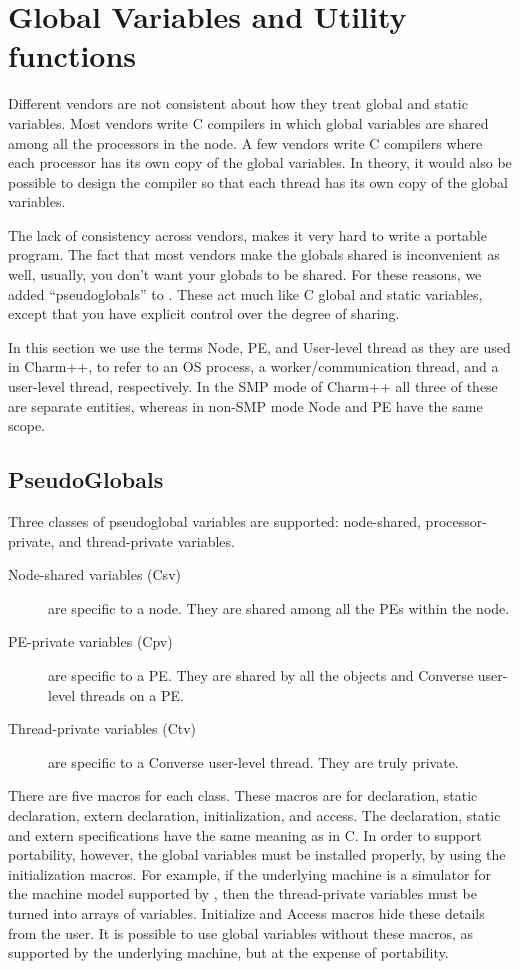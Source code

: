 \section{Global Variables and Utility functions}
\label{globalvars}

Different vendors are not consistent about how they treat global and static
variables.  Most vendors write C compilers in which global variables are
shared among all the processors in the node.  A few vendors write C
compilers where each processor has its own copy of the global variables.
In theory, it would also be possible to design the compiler so that
each thread has its own copy of the global variables.

The lack of consistency across vendors, makes it very hard to write a
portable program.  The fact that most vendors make the globals shared
is inconvenient as well, usually, you don't want your globals to be
shared.  For these reasons, we added ``pseudoglobals'' to \converse{}.
These act much like C global and static variables, except that you have
explicit control over the degree of sharing.

In this section we use the terms Node, PE, and User-level thread as they are used in Charm++,
to refer to an OS process, a worker/communication thread, and a user-level thread, respectively.
In the SMP mode of Charm++ all three of these are separate entities, whereas in non-SMP mode Node
and PE have the same scope.

\subsection{\converse{} PseudoGlobals}

Three classes of pseudoglobal variables are supported: node-shared,
processor-private, and thread-private variables.

\begin{description}
    \item[Node-shared variables (Csv)] are specific to a node. They are
     shared among all the PEs within the node.
 \item[PE-private variables (Cpv)] are specific to a PE. They are
     shared by all the objects and Converse user-level threads on a PE.
\item[Thread-private variables (Ctv)] are specific to a Converse user-level thread. They are
     truly private.
\end{description}

There are five macros for each class. These macros are for
declaration, static declaration, extern declaration, initialization,
and access. The declaration, static and extern specifications have the
same meaning as in C. In order to support portability, however, the
global variables must be installed properly, by using the
initialization macros.  For example, if the underlying machine is a
simulator for the machine model supported by \converse{}, then the
thread-private variables must be turned into arrays of variables.
Initialize and Access macros hide these details from the user.  It is
possible to use global variables without these macros, as supported by
the underlying machine, but at the expense of portability.

